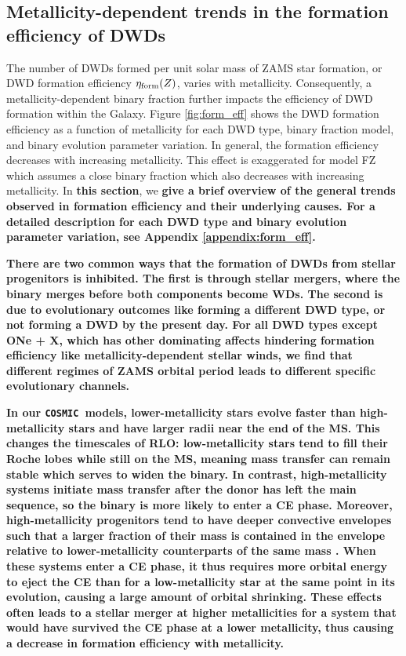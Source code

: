 \documentclass[twocolumn, linenumbers]{aastex631}
\newcommand{\cosmic}{\texttt{COSMIC}}
\begin{document}
\subsection{Metallicity-dependent trends in the formation efficiency of 
DWDs}\label{sec:formeff}
The number of DWDs formed per unit solar mass of ZAMS star formation, or 
DWD formation efficiency $\eta_{\rm{form}}(Z)$, varies with metallicity. 
Consequently, a metallicity-dependent binary fraction further impacts the 
efficiency of DWD formation within the Galaxy. Figure \ref{fig:form_eff} 
shows the DWD formation efficiency as a function of metallicity for each 
DWD type, binary fraction model, and binary evolution parameter variation. 
In general, the formation efficiency decreases with increasing 
metallicity. This effect is exaggerated for model FZ which assumes a close 
binary fraction which also decreases with increasing metallicity. In 
\textbf{this section}, we \textbf{give a brief overview of the general 
trends observed in formation efficiency and their underlying causes. For a 
detailed description for each DWD type and binary evolution parameter 
variation, see Appendix \ref{appendix:form_eff}.}

\textbf{There are two common ways that the formation of DWDs from stellar 
progenitors is inhibited. The first is through stellar mergers, where the 
binary merges before both components become WDs. The second is due to 
evolutionary outcomes like forming a different DWD type, or not forming a 
DWD by the present day. For all DWD types except ONe + X, which has other 
dominating affects hindering formation efficiency like 
metallicity-dependent stellar winds, we find that different regimes of 
ZAMS orbital period leads to different specific evolutionary channels.}

\textbf{In our \cosmic\ models, lower-metallicity stars evolve faster than 
high-metallicity stars and have larger radii near the end of the MS. This 
changes the timescales of RLO: low-metallicity stars tend to fill their 
Roche lobes while still on the MS, meaning mass transfer can remain stable 
which serves to widen the binary. In contrast, high-metallicity systems 
initiate mass transfer after the donor has left the main sequence, so the 
binary is more likely to enter a CE phase. Moreover, high-metallicity 
progenitors tend to have deeper convective envelopes such that a larger 
fraction of their mass is contained in the envelope relative to 
lower-metallicity counterparts of the same mass \citep{Amard2019, 
Amard2020}. When these systems enter a CE phase, it thus requires more 
orbital energy to eject the CE than for a low-metallicity star at the same 
point in its evolution, causing a large amount of orbital shrinking. These 
effects often leads to a stellar merger at higher metallicities for a 
system that would have survived the CE phase at a lower metallicity, thus 
causing a decrease in formation efficiency with metallicity.} 
\end{document}

